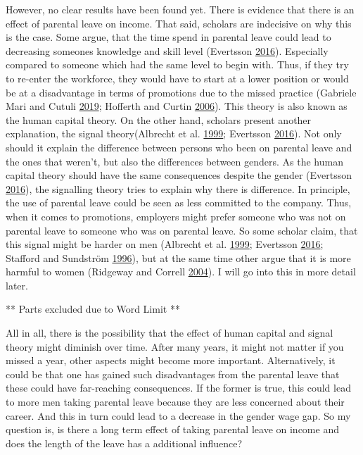 \documentclass[
  11pt,
]{article}
\begin{document}
However, no clear results have been found yet.
There is evidence that there is an effect of parental leave on income. That said, scholars are indecisive on why this is the case. Some argue, that the time spend in parental leave could lead to decreasing someones knowledge and skill level (Evertsson \protect\hyperlink{ref-evertsson_parental_2016}{2016}). Especially compared to someone which had the same level to begin with. Thus, if they try to re-enter the workforce, they would have to start at a lower position or would be at a disadvantage in terms of promotions due to the missed practice (Gabriele Mari and Cutuli \protect\hyperlink{ref-gabriele_mari_parental_2019}{2019}; Hofferth and Curtin \protect\hyperlink{ref-hofferth_parental_2006}{2006}). This theory is also known as the human capital theory. On the other hand, scholars present another explanation, the signal theory(Albrecht et al. \protect\hyperlink{ref-albrecht_career_1999}{1999}; Evertsson \protect\hyperlink{ref-evertsson_parental_2016}{2016}).
Not only should it explain the difference between persons who been on parental leave and the ones that weren't, but also the differences between genders. As the human capital theory should have the same consequences despite the gender (Evertsson \protect\hyperlink{ref-evertsson_parental_2016}{2016}), the signalling theory tries to explain why there is difference. In principle, the use of parental leave could be seen as less committed to the company. Thus, when it comes to promotions, employers might prefer someone who was not on parental leave to someone who was on parental leave. So some scholar claim, that this signal might be harder on men (Albrecht et al. \protect\hyperlink{ref-albrecht_career_1999}{1999}; Evertsson \protect\hyperlink{ref-evertsson_parental_2016}{2016}; Stafford and Sundström \protect\hyperlink{ref-stafford_time_1996}{1996}), but at the same time other argue that it is more harmful to women (Ridgeway and Correll \protect\hyperlink{ref-ridgeway_unpacking_2004}{2004}). I will go into this in more detail later.

** Parts excluded due to Word Limit **

All in all, there is the possibility that the effect of human capital and signal theory might diminish over time. After many years, it might not matter if you missed a year, other aspects might become more important. Alternatively, it could be that one has gained such disadvantages from the parental leave that these could have far-reaching consequences. If the former is true, this could lead to more men taking parental leave because they are less concerned about their career. And this in turn could lead to a decrease in the gender wage gap.
So my question is, is there a long term effect of taking parental leave on income and does the length of the leave has a additional influence?
\end{document}
